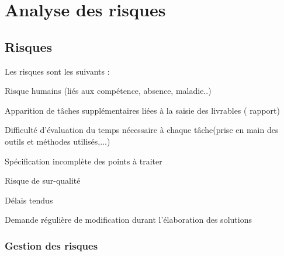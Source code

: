\section{Analyse des risques}
\subsection{Risques}

\setcounter{risques}{0}

\newcommand{\risque}[1]{
    \addtocounter{risques}{1}
    \item[R\therisques]{\indent#1}
}
Les risques sont les suivants :
\begin{description}
    \risque{Risque humains (liés aux compétence, absence, maladie..)}
    \risque{Apparition de tâches supplémentaires liées à la saisie des livrables ( rapport)}
    \risque{Difficulté d’évaluation du temps nécessaire à chaque tâche(prise en main des outils et méthodes utilisés,...)}
    \risque{Spécification incomplète des points à traiter}
    \risque{Risque de sur-qualité}
    \risque{Délais tendus}
    \risque{Demande régulière de modification durant l’élaboration des solutions}
\end{description}

\subsubsection{Gestion des risques}

\setcounter{solutions}{0}

\newcommand{\solution}[1]{
    \addtocounter{solutions}{1}
    \item[S\thesolutions]{\indent#1}
}


